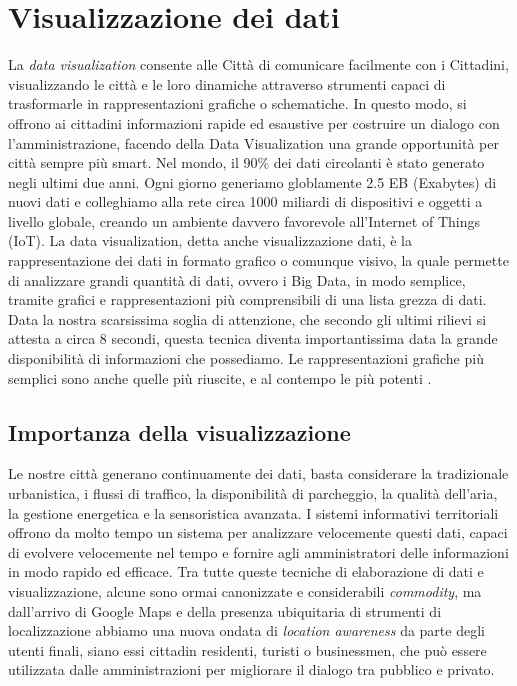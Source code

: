 \section{Visualizzazione dei dati}  %
La \textit{data visualization} consente alle Città di comunicare facilmente con i Cittadini, visualizzando le città e le loro dinamiche attraverso strumenti capaci di trasformarle in rappresentazioni grafiche o schematiche. In questo modo, si offrono ai cittadini informazioni rapide ed esaustive per costruire un dialogo con l'amministrazione, facendo della Data Visualization una grande opportunità per città sempre più smart.
Nel mondo, il 90\% dei dati circolanti è stato generato negli ultimi due anni. Ogni giorno generiamo globlamente 2.5 EB (Exabytes) di nuovi dati e colleghiamo alla rete circa 1000 miliardi di dispositivi e oggetti a livello globale, creando un ambiente davvero favorevole all'Internet of Things (IoT).
La data visualization, detta anche visualizzazione dati, è la rappresentazione dei dati in formato grafico o comunque visivo, la quale permette di analizzare grandi quantità di dati, ovvero i Big Data, in modo semplice, tramite grafici e rappresentazioni più comprensibili di una lista grezza di dati. Data la nostra scarsissima soglia di attenzione, che secondo gli ultimi rilievi si attesta a circa 8 secondi, questa tecnica diventa importantissima data la grande disponibilità di informazioni che possediamo. Le rappresentazioni grafiche più semplici sono anche quelle più riuscite, e al contempo le più potenti \cite{DataVisualization_Citta}.

\subsection{Importanza della visualizzazione}
Le nostre città generano continuamente dei dati, basta considerare la tradizionale urbanistica, i flussi di traffico, la disponibilità di parcheggio, la qualità dell'aria, la gestione energetica e la sensoristica avanzata. I sistemi informativi territoriali offrono da molto tempo un sistema per analizzare velocemente questi dati, capaci di evolvere velocemente nel tempo e fornire agli amministratori delle informazioni in modo rapido ed efficace. Tra tutte queste tecniche di elaborazione di dati e visualizzazione, alcune sono ormai canonizzate e considerabili \textit{commodity}, ma dall'arrivo di Google Maps e della presenza ubiquitaria di strumenti di localizzazione abbiamo una nuova ondata di \textit{location awareness} da parte degli utenti finali, siano essi cittadin residenti, turisti o businessmen, che può essere utilizzata dalle amministrazioni per migliorare il dialogo tra pubblico e privato.


